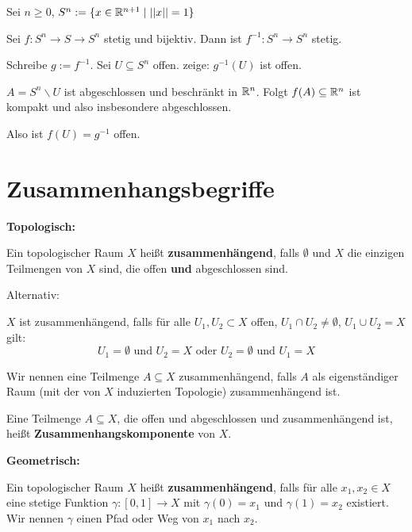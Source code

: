 \documentclass[main.tex]{subfiles}
\begin{document}
\begin{Beispiel}
  Sei $n \geq 0$, $S^n := \{x \in \mathbb{R}^{n+1} \mid ||x|| = 1 \}$

  Sei $f: S^n \to S \to S^n$ stetig und bijektiv. Dann ist $f^{-1}: S^n \to S^n$ stetig.

  Schreibe  $g := f^{-1}$. Sei $U \subseteq S^n$ offen. zeige: $g^{-1}(U)$ ist offen.

  $A = S^n \backslash U$ ist abgeschlossen und beschränkt in $\mathbb{R}^n$. Folgt $f(A) \subseteq \mathbb{R}^n$ ist kompakt und also insbesondere abgeschlossen.

  Also ist $f(U) = g^{-1}$ offen.
\end{Beispiel}


\section{Zusammenhangsbegriffe}

\begin{minipage}[t]{0.5\textwidth}
  \textbf{Topologisch:}
  \begin{Definition}[Zusammenhang]
    Ein topologischer Raum $X$ heißt \textbf{zusammenhängend}, falls $\emptyset$ und $X$ die einzigen Teilmengen von $X$ sind, die offen \textbf{und} abgeschlossen sind.
  \end{Definition}
  Alternativ:
  \begin{Definition}
    $X$ ist zusammenhängend, falls für alle $U_1, U_2 \subset X$ offen, $U_1 \cap U_2 \neq \emptyset$, $U_1 \cup U_2 = X$ gilt:
    $$U_1 = \emptyset \text{ und } U_2 = X \text{ oder } U_2 = \emptyset \text{ und } U_1 = X$$
  \end{Definition}
  \begin{Definition}
    Wir nennen eine Teilmenge $A \subseteq X$ zusammenhängend, falls $A$ als eigenständiger Raum (mit der von $X$ induzierten Topologie) zusammenhängend ist.
  \end{Definition}
  \begin{Definition}
    Eine Teilmenge $A \subseteq X$, die offen und abgeschlossen und zusammenhängend ist, heißt \textbf{Zusammenhangskomponente} von $X$.
  \end{Definition}
\end{minipage}
\begin{minipage}[t]{0.5\textwidth}
  \textbf{Geometrisch:}
  \begin{Definition}[Zusammenhang]
    Ein topologischer Raum $X$ heißt \textbf{zusammenhängend}, falls für alle $x_1,x_2 \in X$ eine stetige Funktion $\gamma : [0,1] \to X$ mit $\gamma(0) = x_1$ und $\gamma(1) = x_2$ existiert. Wir nennen $\gamma$ einen Pfad oder Weg von $x_1$ nach $x_2$.
  \end{Definition}
\end{minipage}
\end{document}
